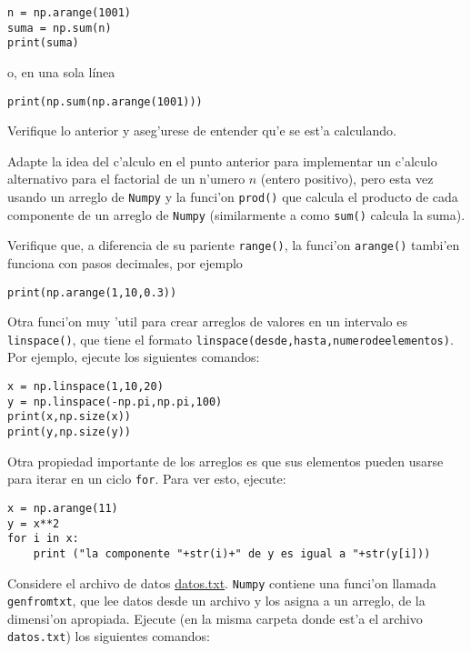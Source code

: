 \documentclass[11pt]{exam}
\begin{document}
\begin{questions}
\begin{verbatim}
n = np.arange(1001)
suma = np.sum(n)
print(suma)
\end{verbatim}

o, en una sola línea

\begin{verbatim}
print(np.sum(np.arange(1001)))
\end{verbatim}

Verifique lo anterior y aseg'urese de entender qu'e se est'a calculando.

\item Adapte la idea del c'alculo en el punto anterior para implementar un c'alculo alternativo para el factorial de un n'umero $n$ (entero positivo), pero esta vez usando un arreglo de \texttt{Numpy} y la funci'on \texttt{prod()} que calcula el producto de cada componente de un arreglo de \texttt{Numpy} (similarmente a como \texttt{sum()} calcula la suma).

\item Verifique que, a diferencia de su pariente \texttt{range()}, la funci'on \texttt{arange()} tambi'en funciona con pasos decimales, por ejemplo

\begin{verbatim}
print(np.arange(1,10,0.3))
\end{verbatim}

\item Otra funci'on muy 'util para crear arreglos de valores en un intervalo es \texttt{linspace()}, que tiene el formato \texttt{linspace(desde,hasta,numerodeelementos)}. Por ejemplo, ejecute los siguientes comandos:

\begin{verbatim}
x = np.linspace(1,10,20)
y = np.linspace(-np.pi,np.pi,100)
print(x,np.size(x))
print(y,np.size(y))
\end{verbatim}

\item Otra propiedad importante de los arreglos es que sus elementos pueden usarse para iterar en un ciclo \texttt{for}. Para ver esto, ejecute:

\begin{verbatim}
x = np.arange(11)
y = x**2
for i in x:
	print ("la componente "+str(i)+" de y es igual a "+str(y[i]))
\end{verbatim}

\item Considere el archivo de datos \href{https://raw.githubusercontent.com/gfrubi/CC/master/guias/11/datos.txt}{datos.txt}. \texttt{Numpy} contiene una funci'on llamada \texttt{genfromtxt}, que lee datos desde un archivo y los asigna a un arreglo, de la dimensi'on apropiada. Ejecute (en la misma carpeta donde est'a el archivo \texttt{datos.txt}) los siguientes comandos:


\end{questions}
\end{document}
